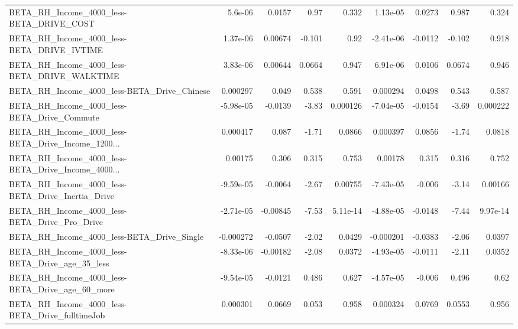 \begin{tabular}{lrrrrrrrr}
BETA\_RH\_Income\_4000\_less-BETA\_DRIVE\_COST           &     5.6e-06 &       0.0157 &     0.97 &    0.332 &   1.13e-05 &      0.0273 &        0.987 &         0.324 \\
BETA\_RH\_Income\_4000\_less-BETA\_DRIVE\_IVTIME         &    1.37e-06 &      0.00674 &   -0.101 &     0.92 &  -2.41e-06 &     -0.0112 &       -0.102 &         0.918 \\
BETA\_RH\_Income\_4000\_less-BETA\_DRIVE\_WALKTIME       &    3.83e-06 &      0.00644 &   0.0664 &    0.947 &   6.91e-06 &      0.0106 &       0.0674 &         0.946 \\
BETA\_RH\_Income\_4000\_less-BETA\_Drive\_Chinese        &    0.000297 &        0.049 &    0.538 &    0.591 &   0.000294 &      0.0498 &        0.543 &         0.587 \\
BETA\_RH\_Income\_4000\_less-BETA\_Drive\_Commute        &   -5.98e-05 &      -0.0139 &    -3.83 & 0.000126 &  -7.04e-05 &     -0.0154 &        -3.69 &      0.000222 \\
BETA\_RH\_Income\_4000\_less-BETA\_Drive\_Income\_1200... &    0.000417 &        0.087 &    -1.71 &   0.0866 &   0.000397 &      0.0856 &        -1.74 &        0.0818 \\
BETA\_RH\_Income\_4000\_less-BETA\_Drive\_Income\_4000... &     0.00175 &        0.306 &    0.315 &    0.753 &    0.00178 &       0.315 &        0.316 &         0.752 \\
BETA\_RH\_Income\_4000\_less-BETA\_Drive\_Inertia\_Drive  &   -9.59e-05 &      -0.0064 &    -2.67 &  0.00755 &  -7.43e-05 &      -0.006 &        -3.14 &       0.00166 \\
BETA\_RH\_Income\_4000\_less-BETA\_Drive\_Pro\_Drive      &   -2.71e-05 &     -0.00845 &    -7.53 & 5.11e-14 &  -4.88e-05 &     -0.0148 &        -7.44 &      9.97e-14 \\
BETA\_RH\_Income\_4000\_less-BETA\_Drive\_Single         &   -0.000272 &      -0.0507 &    -2.02 &   0.0429 &  -0.000201 &     -0.0383 &        -2.06 &        0.0397 \\
BETA\_RH\_Income\_4000\_less-BETA\_Drive\_age\_35\_less    &   -8.33e-06 &     -0.00182 &    -2.08 &   0.0372 &  -4.93e-05 &     -0.0111 &        -2.11 &        0.0352 \\
BETA\_RH\_Income\_4000\_less-BETA\_Drive\_age\_60\_more    &   -9.54e-05 &      -0.0121 &    0.486 &    0.627 &  -4.57e-05 &      -0.006 &        0.496 &          0.62 \\
BETA\_RH\_Income\_4000\_less-BETA\_Drive\_fulltimeJob    &    0.000301 &       0.0669 &    0.053 &    0.958 &   0.000324 &      0.0769 &       0.0553 &         0.956 \\

\end{tabular}
